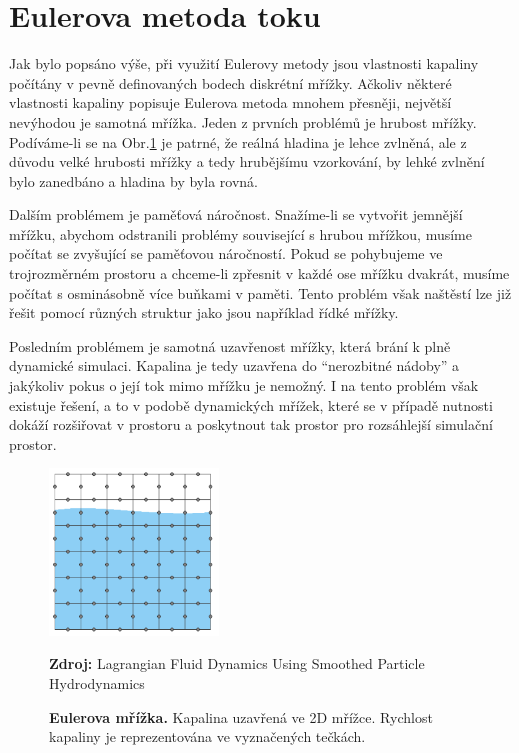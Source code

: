 \section{Eulerova metoda toku}
Jak bylo popsáno výše, při využití Eulerovy metody jsou vlastnosti kapaliny počítány v pevně definovaných bodech diskrétní mřížky. Ačkoliv některé vlastnosti kapaliny popisuje Eulerova metoda mnohem přesněji, největší nevýhodou je samotná mřížka. Jeden z prvních problémů je hrubost mřížky. Podíváme-li se na Obr.\ref{fig:EulerGrid} je patrné, že reálná hladina je lehce zvlněná, ale z důvodu velké hrubosti mřížky a tedy hrubějšímu vzorkování, by lehké zvlnění bylo zanedbáno a hladina by byla rovná. 

Dalším problémem je paměťová náročnost. Snažíme-li se vytvořit jemnější mřížku, abychom odstranili problémy související s hrubou mřížkou, musíme počítat se zvyšující se paměťovou náročností. Pokud se pohybujeme ve trojrozměrném prostoru a chceme-li zpřesnit v každé ose mřížku dvakrát, musíme počítat s osminásobně více buňkami v paměti. Tento problém však naštěstí lze již řešit pomocí různých struktur jako jsou například řídké mřížky.

Posledním problémem je samotná uzavřenost mřížky, která brání k plně dynamické simulaci. Kapalina je tedy uzavřena do \enquote{nerozbitné nádoby} a jakýkoliv pokus o její tok mimo mřížku je nemožný. I na tento problém však existuje řešení, a to v podobě dynamických mřížek, které se v případě nutnosti dokáží rozšiřovat v prostoru a poskytnout tak prostor pro rozsáhlejší simulační prostor.
\cite{KelagerSPH} 

\begin{figure}[hbt]
	\centering
	\includegraphics[width=0.4\textwidth]{obrazky-figures/GridEuler.PNG}
	\caption{\textbf{Eulerova mřížka.} Kapalina uzavřená ve 2D mřížce. Rychlost kapaliny je reprezentována ve vyznačených tečkách.}
	\textbf{Zdroj: } Lagrangian Fluid Dynamics Using Smoothed Particle Hydrodynamics \cite{KelagerSPH}
	\label{fig:EulerGrid}
\end{figure}

